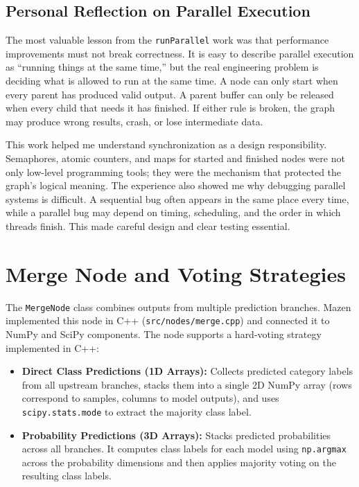 \documentclass[12pt,a4paper,oneside]{report}
\newcommand{\modulepath}[1]{\texttt{#1}}
\begin{document}
\subsection{Personal Reflection on Parallel Execution}
\noindent The most valuable lesson from the \modulepath{runParallel} work was that performance improvements must not break correctness. It is easy to describe parallel execution as ``running things at the same time,'' but the real engineering problem is deciding what is allowed to run at the same time. A node can only start when every parent has produced valid output. A parent buffer can only be released when every child that needs it has finished. If either rule is broken, the graph may produce wrong results, crash, or lose intermediate data.

This work helped me understand synchronization as a design responsibility. Semaphores, atomic counters, and maps for started and finished nodes were not only low-level programming tools; they were the mechanism that protected the graph's logical meaning. The experience also showed me why debugging parallel systems is difficult. A sequential bug often appears in the same place every time, while a parallel bug may depend on timing, scheduling, and the order in which threads finish. This made careful design and clear testing essential.

\section{Merge Node and Voting Strategies}
The \modulepath{MergeNode} class combines outputs from multiple prediction branches. Mazen implemented this node in C++ (\modulepath{src/nodes/merge.cpp}) and connected it to NumPy and SciPy components. The node supports a hard-voting strategy implemented in C++:
\begin{itemize}[leftmargin=*]
    \item \textbf{Direct Class Predictions (1D Arrays):} Collects predicted category labels from all upstream branches, stacks them into a single 2D NumPy array (rows correspond to samples, columns to model outputs), and uses \modulepath{scipy.stats.mode} to extract the majority class label.
    \item \textbf{Probability Predictions (3D Arrays):} Stacks predicted probabilities across all branches. It computes class labels for each model using \texttt{np.argmax} across the probability dimensions and then applies majority voting on the resulting class labels.
\end{itemize}
\end{document}
